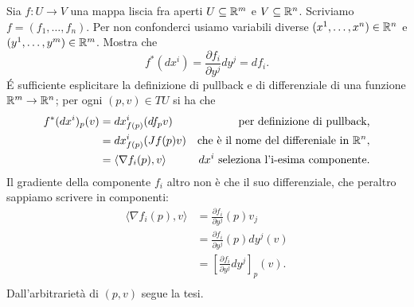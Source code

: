 \documentclass[a4paper]{article}
\begin{document}
\begin{ex}[6.3]{Sia $ f \colon U \to V $ una mappa liscia fra aperti $ U \subseteq \mathbb{R}^m $ e $ V \subseteq \mathbb{R}^n $. Scriviamo $ f = (f_1, \dots, f_n). $ Per non confonderci usiamo variabili diverse
		$ (x^1, \dots, x^n) \in \mathbb{R}^n$
		e $ (y^1, \dots, y^	m) \in \mathbb{R}^m$. Mostra che
		\[ f^*(dx^i)= \frac{\partial f_i}{\partial y^j}dy^j = df_i. \]}
	É sufficiente esplicitare la definizione di pullback e di differenziale di una funzione $\mathbb{R}^m \to \mathbb{R}^n$; per ogni $(p, v) \in TU$ si ha che
	\begin{align*}
		f^\ast(dx^i)_p(v) & = dx^i_{f(p)}(df_pv)
		& \text{per definizione di pullback,} \\
		& = dx^i_{f(p)}(Jf(p)v)
		& \text{che è il nome del differeniale in } \mathbb{R}^n, \\
		& = \langle \nabla f_i(p), v  \rangle
		& dx^i\text{ seleziona l'i-esima componente}.
	\end{align*}
	Il gradiente della componente $f_i$ altro non è che il suo differenziale, che peraltro sappiamo scrivere in componenti:
	\begin{align*}
	\langle \nabla f_i(p), v  \rangle & = \frac{\partial f_i}{\partial y^j}(p)v_j \\
	&= \frac{\partial f_i}{\partial y^j}(p)dy^j(v) \\
	&= \left[\frac{\partial f_i}{\partial y^j}dy^j\right]_p(v). \\
	\end{align*}
	Dall'arbitrarietà di $ (p, v) $ segue la tesi.
\end{ex}
\end{document}
